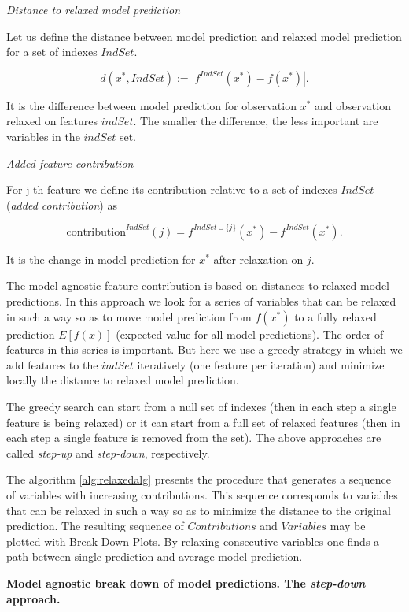 \documentclass[]{book}
\theoremstyle{definition}
\theoremstyle{definition}
\theoremstyle{definition}
\theoremstyle{remark}
\begin{document}
\emph{Distance to relaxed model prediction}

Let us define the distance between model prediction and relaxed model
prediction for a set of indexes \(IndSet\).

\[
d(x^{*}, IndSet) := |f^{IndSet}(x^{*}) - f(x^{*})|.
\]

It is the difference between model prediction for observation \(x^{*}\)
and observation relaxed on features \(indSet\). The smaller the
difference, the less important are variables in the \(indSet\) set.

\emph{Added feature contribution}

For j-th feature we define its contribution relative to a set of indexes
\(IndSet\) (\emph{added contribution}) as

\[
\text{contribution}^{IndSet}(j) = f^{IndSet \cup \{j\}}(x^{*}) - f^{IndSet}(x^{*}).
\]

It is the change in model prediction for \(x^{*}\) after relaxation on
\(j\).

The model agnostic feature contribution is based on distances to relaxed
model predictions. In this approach we look for a series of variables
that can be relaxed in such a way so as to move model prediction from
\(f(x^{*})\) to a fully relaxed prediction \(E [f(x)]\) (expected value
for all model predictions). The order of features in this series is
important. But here we use a greedy strategy in which we add features to
the \(indSet\) iteratively (one feature per iteration) and minimize
locally the distance to relaxed model prediction.

The greedy search can start from a null set of indexes (then in each
step a single feature is being relaxed) or it can start from a full set
of relaxed features (then in each step a single feature is removed from
the set). The above approaches are called \emph{step-up} and
\emph{step-down}, respectively.

The algorithm \ref{alg:relaxedalg} presents the procedure that generates
a sequence of variables with increasing contributions. This sequence
corresponds to variables that can be relaxed in such a way so as to
minimize the distance to the original prediction. The resulting sequence
of \(Contributions\) and \(Variables\) may be plotted with Break Down
Plots. By relaxing consecutive variables one finds a path between single
prediction and average model prediction.

\textbf{Model agnostic break down of model predictions. The
\emph{step-down} approach.}
\end{document}
